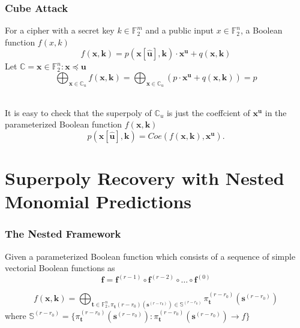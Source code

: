 \documentclass[notheorems,aspectratio=169]{beamer}
\def\bd#1{\boldsymbol{#1}}
\begin{document}
\begin{frame}
    \frametitle{Cube Attack}
    For a cipher with a secret key $k \in  \mathbb{F}^m_2$ and a public input $x \in \mathbb{F}^n_2$, a Boolean function $f(x,k)$
        $$
        f(\boldsymbol{x},\boldsymbol{k})=p(\boldsymbol{x}[\hat{\boldsymbol{u}}],\boldsymbol{k}) \cdot \boldsymbol{x}^{\boldsymbol{u}}
        +q(\boldsymbol{x},\boldsymbol{k})
        $$
        Let $\mathbb{C} ={\boldsymbol{x} \in \mathbb{F}^n_2:\boldsymbol{x}} \preceq \boldsymbol{u}$  
        $$
        \bigoplus_{\boldsymbol{x} \in \mathbb{C}_u}f(\boldsymbol{x},\boldsymbol{k})=\bigoplus_{\boldsymbol{x}\in \mathbb{C}_u}(p \cdot \boldsymbol{x}^{\boldsymbol{u}}+q(\boldsymbol{x},\boldsymbol{k}))=p
        $$
        
        \\It is easy to check that the superpoly of $\mathbb{C}_u$ is just the coeffcient of $\boldsymbol{x}^{\boldsymbol{u}}$ in the
        parameterized Boolean function $f(\boldsymbol{x},\bd{k}) $
        $$
        p(\boldsymbol{x}[\hat{\boldsymbol{u}}],\boldsymbol{k})=Coe(f(\bd{x},\bd{k}),\bd{x}^{\bd{u}}).
        $$

\end{frame}

\section{ Superpoly Recovery with Nested Monomial Predictions}
\begin{frame}
    \frametitle{ The Nested Framework}

    Given a parameterized Boolean function which consists of a sequence of simple
vectorial Boolean functions as
    $$
    \boldsymbol{f}=\boldsymbol{f}^{(r-1)} \circ \boldsymbol{f}^{(r-2)} \circ \dots \circ \boldsymbol{f}^{(0)}
    $$
    
    $$
        f(\bd{x},\bd{k})=\bigoplus_{\bd{t} \in \mathbb{F}^n_2 , \pi_{\bd{t}}(r-r_0)(\bd{s}^{(r-r_0)})\in \mathbb{S}^{(r-r_0)}} 
        \pi _{\bd{t}}^{(r-r_0)}(\bd{s}^{(r-r_0)})
    $$
    where $\mathbb{S}^{(r-r_0)}=\{\pi _{\bd{t}}^{(r-r_0)}(\bd{s}^{(r-r_0)}):\pi _{\bd{t}}^{(r-r_0)}(\bd{s}^{(r-r_0)}) \rightarrow f\}$
\end{frame}
\end{document}
